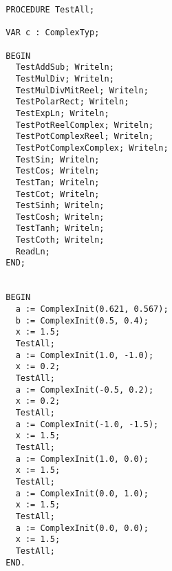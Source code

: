 \begin{refsection}
\begin{lstlisting}
  PROCEDURE TestAll;

  VAR c : ComplexTyp;

  BEGIN
    TestAddSub; Writeln;
    TestMulDiv; Writeln;
    TestMulDivMitReel; Writeln;
    TestPolarRect; Writeln;
    TestExpLn; Writeln;
    TestPotReelComplex; Writeln;
    TestPotComplexReel; Writeln;
    TestPotComplexComplex; Writeln;
    TestSin; Writeln;
    TestCos; Writeln;
    TestTan; Writeln;
    TestCot; Writeln;
    TestSinh; Writeln;
    TestCosh; Writeln;
    TestTanh; Writeln;
    TestCoth; Writeln;
    ReadLn;
  END;


  BEGIN
    a := ComplexInit(0.621, 0.567);
    b := ComplexInit(0.5, 0.4);
    x := 1.5;
    TestAll;
    a := ComplexInit(1.0, -1.0);
    x := 0.2;
    TestAll;
    a := ComplexInit(-0.5, 0.2);
    x := 0.2;
    TestAll;
    a := ComplexInit(-1.0, -1.5);
    x := 1.5;
    TestAll;
    a := ComplexInit(1.0, 0.0);
    x := 1.5;
    TestAll;
    a := ComplexInit(0.0, 1.0);
    x := 1.5;
    TestAll;
    a := ComplexInit(0.0, 0.0);
    x := 1.5;
    TestAll;
  END.
\end{lstlisting}


%

\printbibliography[heading=subbibliography]
\end{refsection}

